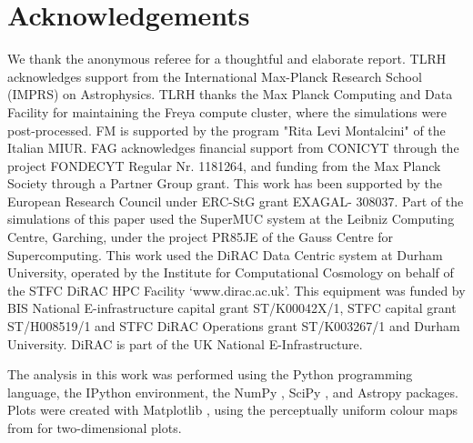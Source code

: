 \documentclass[a4paper,fleqn,usenatbib]{mnras}
\begin{document}
\section*{Acknowledgements}
We thank the anonymous referee for a thoughtful and elaborate report.
TLRH acknowledges support from the International Max-Planck Research School (IMPRS)
on Astrophysics. TLRH thanks the Max Planck Computing and Data Facility for
maintaining the Freya compute cluster, where the simulations were post-processed.
FM is supported by the program "Rita Levi Montalcini" of the Italian MIUR. FAG 
acknowledges financial support from CONICYT through the project FONDECYT Regular 
Nr. 1181264, and funding from the Max Planck Society through a Partner Group grant.
This work has been supported by the European Research Council under ERC-StG grant
EXAGAL- 308037. Part of the simulations of this paper used the SuperMUC system 
at the Leibniz Computing Centre, Garching, under the project PR85JE of the Gauss 
Centre for Supercomputing. This work used the DiRAC Data Centric system at Durham
University, operated by the Institute for Computational Cosmology on behalf of
the STFC DiRAC HPC Facility `www.dirac.ac.uk'. This equipment was funded by BIS 
National E-infrastructure capital grant ST/K00042X/1, STFC capital grant 
ST/H008519/1 and STFC DiRAC Operations grant ST/K003267/1 and Durham University.
DiRAC is part of the UK National E-Infrastructure.


The analysis in this work was performed using the Python \citep{python}
programming language, the IPython \citep{2007CSE.....9c..21P} environment, 
the NumPy \citep{2011CSE....13b..22V}, SciPy \citep{scipy}, and Astropy 
\citep{2013A&A...558A..33A} packages. Plots were created with Matplotlib 
\citep{2007CSE.....9...90H}, using the perceptually uniform colour maps
from \citet{2015arXiv150903700K} for two-dimensional plots.







 


\end{document}
